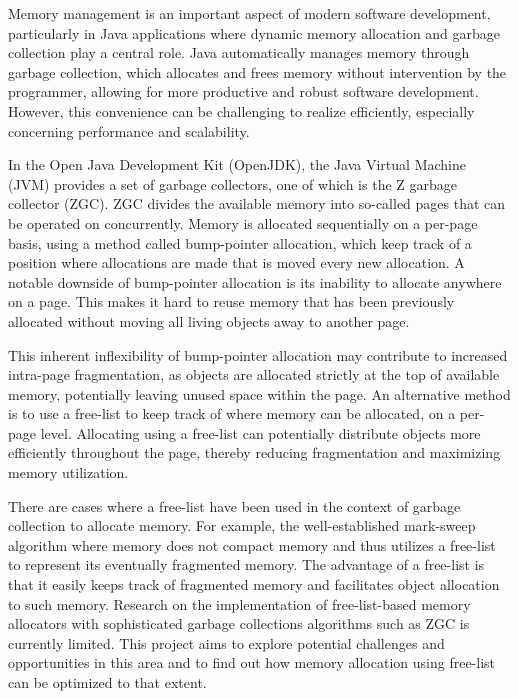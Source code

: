 
Memory management is an important aspect of modern software development, particularly in Java applications where dynamic memory allocation and garbage collection play a central role. Java automatically manages memory through garbage collection, which allocates and frees memory without intervention by the programmer, allowing for more productive and robust software development. However, this convenience can be challenging to realize efficiently, especially concerning performance and scalability.

In the Open Java Development Kit (OpenJDK), the Java Virtual Machine (JVM) provides a set of garbage collectors, one of which is the Z garbage collector (ZGC). ZGC divides the available memory into so-called pages that can be operated on concurrently. Memory is allocated sequentially on a per-page basis, using a method called bump-pointer allocation, which keep track of a position where allocations are made that is moved every new allocation. A notable downside of bump-pointer allocation is its inability to allocate anywhere on a page. This makes it hard to reuse memory that has been previously allocated without moving all living objects away to another page.

This inherent inflexibility of bump-pointer allocation may contribute to increased intra-page fragmentation, as objects are allocated strictly at the top of available memory, potentially leaving unused space within the page. An alternative method is to use a free-list to keep track of where memory can be allocated, on a per-page level. Allocating using a free-list can potentially distribute objects more efficiently throughout the page, thereby reducing fragmentation and maximizing memory utilization.

There are cases where a free-list have been used in the context of garbage collection to allocate memory. For example, the well-established mark-sweep algorithm where memory does not compact memory and thus utilizes a free-list to represent its eventually fragmented memory. The advantage of a free-list is that it easily keeps track of fragmented memory and facilitates object allocation to such memory. Research on the implementation of free-list-based memory allocators with sophisticated garbage collections algorithms such as ZGC is currently limited. This project aims to explore potential challenges and opportunities in this area and to find out how memory allocation using free-list can be optimized to that extent.


